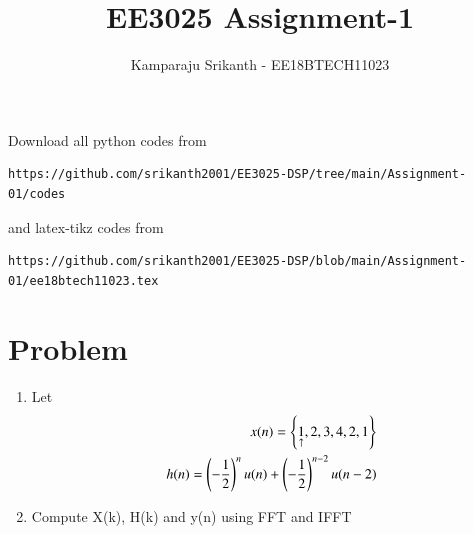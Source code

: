 \documentclass[journal,12pt,twocolumn]{IEEEtran}
\renewcommand\thesection{\arabic{section}}
\begin{document}
     \def\rightbox#1{\makebox[0in][r]{#1}}
     \def\centbox#1{\makebox[0in]{#1}}
     \def\topbox#1{\raisebox{-\baselineskip}[0in][0in]{#1}}
     \def\midbox#1{\raisebox{-0.5\baselineskip}[0in][0in]{#1}}
\vspace{3cm}
\title{EE3025 Assignment-1}
\author{Kamparaju Srikanth - EE18BTECH11023}
\maketitle
\newpage
\bigskip
\renewcommand{\thefigure}{\theenumi}
\renewcommand{\thetable}{\theenumi}
Download all python codes from 
\begin{lstlisting}
https://github.com/srikanth2001/EE3025-DSP/tree/main/Assignment-01/codes
\end{lstlisting}
%
and latex-tikz codes from 
%
\begin{lstlisting}
https://github.com/srikanth2001/EE3025-DSP/blob/main/Assignment-01/ee18btech11023.tex
\end{lstlisting}

\section{Problem}
\begin{enumerate}[label=\thesection.\arabic*.,ref=\thesection.\theenumi]
    
    \item Let
    \begin{align}
        x(n) = \left\{\underset{\uparrow}{1},2,3,4,2,1\right\} \\
        h(n)=\left(-\frac{1}{2}\right)^{n} u(n)+\left(-\frac{1}{2}\right)^{n-2} u(n-2)
    \end{align}
    
    \item Compute X(k), H(k) and y(n) using FFT and IFFT 

\end{enumerate}
\end{document}
